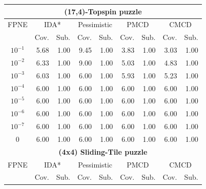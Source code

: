 \documentclass[letterpaper]{article}
\begin{document}
\begin{table}[t]
\begin{tabular}{| c | r  r | r  r | r  r | r  r |}
\hline
\hline
\multicolumn{9}{|c|}{\textbf{(17,4)-Topspin puzzle}} \\
\hline
FPNE     & \multicolumn{2}{|c|}{IDA*}    & \multicolumn{2}{|c|}{Pessimistic}     & \multicolumn{2}{|c|}{PMCD}    & \multicolumn{2}{|c|}{CMCD}    \\
\hline
        & \multicolumn{1}{c}{Cov.} & \multicolumn{1}{c|}{Sub.}  & \multicolumn{1}{c}{Cov.} & \multicolumn{1}{c|}{Sub.}  & \multicolumn{1}{c}{Cov.} & \multicolumn{1}{c|}{Sub.}  & \multicolumn{1}{c}{Cov.} & \multicolumn{1}{c|}{Sub.}  \\
\hline
$10^{-1}$        & 5.68  & 1.00  & 9.45         & 1.00         & 3.83  & 1.00  & 3.03  & 1.00 \\
$10^{-2}$        & 6.33  & 1.00  & 9.00         & 1.00         & 5.03  & 1.00  & 4.83  & 1.00 \\
$10^{-3}$        & 6.03  & 1.00  & 6.00  & 1.00  & 5.93  & 1.00  & 5.23  & 1.00 \\
$10^{-4}$        & 6.00  & 1.00  & 6.00         & 1.00         & 6.00         & 1.00         & 6.00         & 1.00        \\
$10^{-5}$        & 6.00  & 1.00  & 6.00         & 1.00         & 6.00         & 1.00         & 6.00         & 1.00        \\
$10^{-6}$	 & 6.00	 & 1.00	 & 6.00	 & 1.00	 & 6.00	 & 1.00	 & 6.00	 & 1.00	\\
$10^{-7}$	 & 6.00	 & 1.00	 & 6.00	 & 1.00	 & 6.00	 & 1.00	 & 6.00	 & 1.00	\\
0        & 6.00  & 1.00          & 6.00         & 1.00         & 6.00         & 1.00         & 6.00         & 1.00        \\
\hline
\hline
\multicolumn{9}{|c|}{\textbf{(4x4) Sliding-Tile puzzle}} \\
\hline
FPNE     & \multicolumn{2}{|c|}{IDA*}    & \multicolumn{2}{|c|}{Pessimistic}     & \multicolumn{2}{|c|}{PMCD}    & \multicolumn{2}{|c|}{CMCD}    \\
\hline
        & \multicolumn{1}{c}{Cov.} & \multicolumn{1}{c|}{Sub.}  & \multicolumn{1}{c}{Cov.} & \multicolumn{1}{c|}{Sub.}  & \multicolumn{1}{c}{Cov.} & \multicolumn{1}{c|}{Sub.}  & \multicolumn{1}{c}{Cov.} & \multicolumn{1}{c|}{Sub.}  \\
\hline

\end{tabular}
\end{table}
\end{document}
